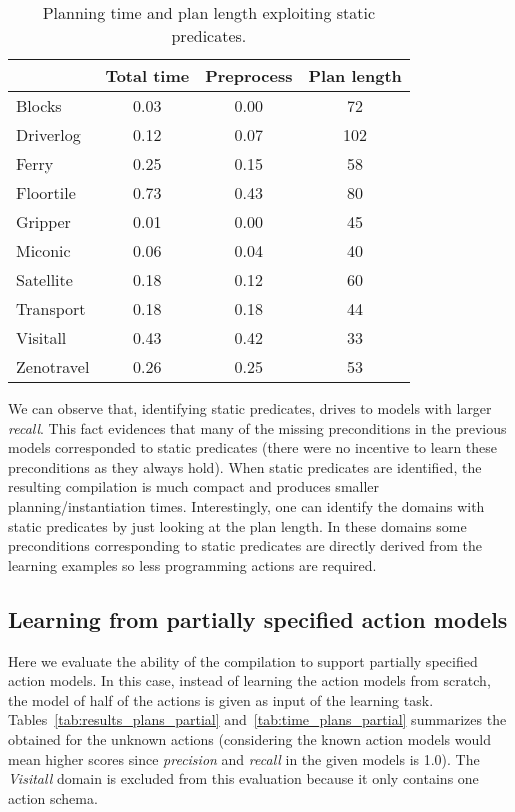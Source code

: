 \documentclass[letterpaper]{article} %
\begin{document}
\begin{table}[hbt!]
\begin{footnotesize}
	\begin{center}
		\begin{tabular}{l|c|c|c|}			
			 & Total time & Preprocess & Plan length  \\
			\hline
			Blocks & 0.03 & 0.00 & 72 \\
			Driverlog & 0.12 & 0.07 & 102 \\
			Ferry & 0.25 & 0.15 & 58 \\
			Floortile & 0.73 & 0.43 & 80 \\
			Gripper & 0.01 & 0.00 & 45 \\
			Miconic & 0.06 & 0.04 & 40 \\
			Satellite & 0.18 & 0.12 & 60 \\
			Transport & 0.18 & 0.18 & 44 \\
			Visitall & 0.43 & 0.42 & 33 \\
			Zenotravel & 0.26 & 0.25 & 53
		\end{tabular}
	\end{center}
        \end{footnotesize}
	\caption{\small Planning time and plan length exploiting static predicates.}
	\label{tab:time_plans_static}	
\end{table}

We can observe that, identifying static predicates, drives to models with larger {\em recall}. This fact evidences that many of the missing preconditions in the previous models corresponded to static predicates (there were no incentive to learn these preconditions as they always hold). When static predicates are identified, the resulting compilation is much compact and produces smaller planning/instantiation times. Interestingly, one can identify the domains with static predicates by just looking at the plan length. In these domains some preconditions corresponding to static predicates are directly derived from the learning examples so less programming actions are required.


\subsection{Learning from partially specified action models}

Here we evaluate the ability of the compilation to support partially specified action models. In this case, instead of learning the action models from scratch, the model of half of the actions is given as input of the learning task. Tables~\ref{tab:results_plans_partial} and~\ref{tab:time_plans_partial} summarizes the obtained for the unknown actions (considering the known action models would mean higher scores since {\em precision} and {\em recall} in the given models is 1.0). The {\em Visitall} domain is excluded from this evaluation because it only contains one action schema.	
\end{document}
